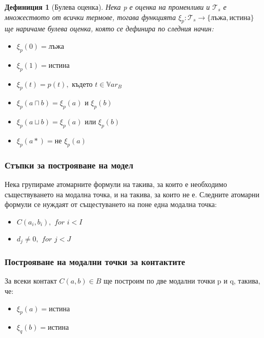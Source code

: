 \documentclass{beamer}
\newtheorem{defn}{Дефиниция}[section]
\newcommand{\Var}{\mathbb{V}ar}
\newcommand{\vBool}{\xi}
\newcommand{\Ts}{\mathcal{T}_s}
\begin{document}
\begin{frame}
\begin{defn}[Булева оценка]
		Нека p е оценка на променливи и $\Ts$ е множеството от всички термове, тогава 
		функцията $\vBool_p : \Ts \rightarrow \{ \textbf{лъжа}, \textbf{истина}\}$ ще наричаме булева оценка, която се дефинира по следния начин:
		\begin{itemize}
			\item $\vBool_p(0) = \textbf{лъжа}$
			\item $\vBool_p(1) = \textbf{истина}$
			\item $\vBool_p(t) =p(t), \textit{ където } t \in \Var_B$
			\item $\vBool_p(a \sqcap b) = \vBool_p(a) \textit{ и } \vBool_p(b)$
			\item $\vBool_p(a \sqcup b) = \vBool_p(a) \textit{ или } \vBool_p(b)$
			\item $\vBool_p(a*) = \textit{не } \vBool_p(a)$
		\end{itemize}
\end{defn}
\end{frame}

\begin{frame}\frametitle{Стъпки за построяване на модел}
	Нека групираме атомарните формули на такива, за които е необходимо съществуването на модална точка, и на такива, за които не е.
\newline
	Следните атомарни формули се нуждаят от същестуването на поне една модална точка:
		\begin{itemize}
			\item $C(a_i, b_i), \textit{ for } i < I$
			\item $d_j \neq 0, \textit{ for } j < J$
		\end{itemize}
\end{frame}

\begin{frame}\frametitle{Построяване на модални точки за контактите}
	За всеки контакт $C(a, b) \in B$ ще построим по две модални точки p и q, такива, че:
		\begin{itemize}
			\item $\vBool_{p}(a) = \textbf{истина}$
			\item $\vBool_{q}(b) = \textbf{истина}$
		\end{itemize}
\end{frame}
\end{document}
